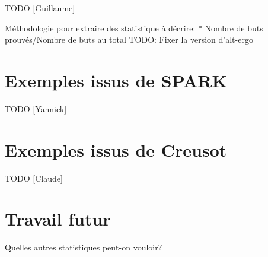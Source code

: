 \documentclass[a4paper,11pt]{article}
\begin{document}
TODO [Guillaume]

Méthodologie pour extraire des statistique à décrire:
* Nombre de buts prouvés/Nombre de buts au total
TODO: Fixer la version d'alt-ergo

\section{Exemples issus de SPARK}

TODO [Yannick]

\section{Exemples issus de Creusot}

TODO [Claude]

\section{Travail futur}

Quelles autres statistiques peut-on vouloir?
\end{document}
